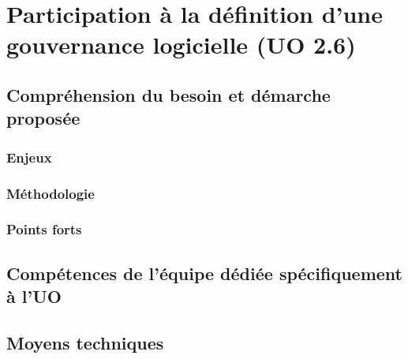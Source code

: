 	\section{Participation à la définition d’une gouvernance logicielle (UO 2.6)}
	\subsection{Compréhension du besoin et démarche proposée}
	\subsubsection{Enjeux}
	\subsubsection{Méthodologie}
	\subsubsection{Points forts}
	\subsection{Compétences de l'équipe dédiée spécifiquement à l'UO}	
	\subsection{Moyens techniques}	